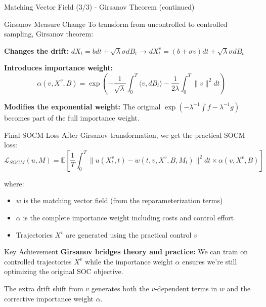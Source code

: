 \documentclass[aspectratio=169,xcolor=dvipsnames]{beamer}
\begin{document}
\begin{frame}[allowframebreaks]{Matching Vector Field (3/3) - Girsanov Theorem (continued)}

    
    \begin{alertblock}{Girsanov Measure Change}
        To transform from uncontrolled to controlled sampling, Girsanov theorem:
        
        \textbf{Changes the drift:} $dX_t = b dt + \sqrt{\lambda}\sigma dB_t$ → $dX_t^v = (b + \sigma v) dt + \sqrt{\lambda}\sigma dB_t$
        
        \textbf{Introduces importance weight:} 
        $$\alpha(v, X^v, B) = \exp\left(-\frac{1}{\sqrt{\lambda}}\int_0^T \langle v, dB_t\rangle - \frac{1}{2\lambda}\int_0^T \|v\|^2 dt\right)$$
        
        \textbf{Modifies the exponential weight:} The original $\exp(-\lambda^{-1}\int f - \lambda^{-1}g)$ becomes part of the full importance weight.
    \end{alertblock}
    
    \vspace{0.5cm}
    
    \begin{alertblock}{Final SOCM Loss}
        After Girsanov transformation, we get the practical SOCM loss:
        \begin{equation}
        \mathcal{L}_{SOCM}(u, M) = \mathbb{E}\left[\frac{1}{T}\int_0^T \|u(X^v_t,t) - w(t, v, X^v, B, M_t)\|^2 dt \times \alpha(v, X^v, B)\right]
        \end{equation}
        
        where:
        \begin{itemize}
            \item $w$ is the matching vector field (from the reparameterization terms)
            \item $\alpha$ is the complete importance weight including costs and control effort
            \item Trajectories $X^v$ are generated using the practical control $v$
        \end{itemize}
    \end{alertblock}
    
    \vspace{0.5cm}
    
    \begin{block}{Key Achievement}
        \textbf{Girsanov bridges theory and practice:} We can train on controlled trajectories $X^v$ while the importance weight $\alpha$ ensures we're still optimizing the original SOC objective.
        
        The extra drift shift from $v$ generates both the $v$-dependent terms in $w$ and the corrective importance weight $\alpha$.
    \end{block}

\end{frame}
\end{document}
